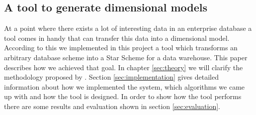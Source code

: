 \subsection{A tool to generate dimensional models}

At a point where there exists a lot of interesting data in an enterprise database a tool comes in handy that can transfer this data into a dimensional model.
According to this we implemented in this project a tool which transforms an arbitrary database scheme into a Star Scheme for a data warehouse.
This paper describes how we achieved that goal.
In chapter \ref{sec:theory} we will clarify the methodology proposed by \cite{moody2000enterprise}.
Section \ref{sec:implementation} gives detailed information about how we implemented the system, which algorithms we came up with and how the tool is designed.
In order to show how the tool performs there are some results and evaluation shown in section \ref{sec:evaluation}.

